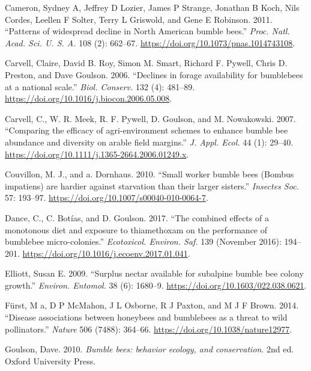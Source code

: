 \documentclass[11pt,]{article}
\begin{document}
\leavevmode\hypertarget{ref-Cameron2011}{}%
Cameron, Sydney A, Jeffrey D Lozier, James P Strange, Jonathan B Koch,
Nils Cordes, Leellen F Solter, Terry L Griswold, and Gene E Robinson.
2011. ``Patterns of widespread decline in North American bumble bees.''
\emph{Proc. Natl. Acad. Sci. U. S. A.} 108 (2): 662--67.
\url{https://doi.org/10.1073/pnas.1014743108}.

\leavevmode\hypertarget{ref-Carvell2006b}{}%
Carvell, Claire, David B. Roy, Simon M. Smart, Richard F. Pywell, Chris
D. Preston, and Dave Goulson. 2006. ``Declines in forage availability
for bumblebees at a national scale.'' \emph{Biol. Conserv.} 132 (4):
481--89. \url{https://doi.org/10.1016/j.biocon.2006.05.008}.

\leavevmode\hypertarget{ref-Carvell2007}{}%
Carvell, C., W. R. Meek, R. F. Pywell, D. Goulson, and M. Nowakowski.
2007. ``Comparing the efficacy of agri-environment schemes to enhance
bumble bee abundance and diversity on arable field margins.'' \emph{J.
Appl. Ecol.} 44 (1): 29--40.
\url{https://doi.org/10.1111/j.1365-2664.2006.01249.x}.

\leavevmode\hypertarget{ref-Couvillon2010}{}%
Couvillon, M. J., and a. Dornhaus. 2010. ``Small worker bumble bees
(Bombus impatiens) are hardier against starvation than their larger
sisters.'' \emph{Insectes Soc.} 57: 193--97.
\url{https://doi.org/10.1007/s00040-010-0064-7}.

\leavevmode\hypertarget{ref-Dance2017}{}%
Dance, C., C. Botías, and D. Goulson. 2017. ``The combined effects of a
monotonous diet and exposure to thiamethoxam on the performance of
bumblebee micro-colonies.'' \emph{Ecotoxicol. Environ. Saf.} 139
(November 2016): 194--201.
\url{https://doi.org/10.1016/j.ecoenv.2017.01.041}.

\leavevmode\hypertarget{ref-Elliott2009}{}%
Elliott, Susan E. 2009. ``Surplus nectar available for subalpine bumble
bee colony growth.'' \emph{Environ. Entomol.} 38 (6): 1680--9.
\url{https://doi.org/10.1603/022.038.0621}.

\leavevmode\hypertarget{ref-Furst2014}{}%
Fürst, M a, D P McMahon, J L Osborne, R J Paxton, and M J F Brown. 2014.
``Disease associations between honeybees and bumblebees as a threat to
wild pollinators.'' \emph{Nature} 506 (7488): 364--66.
\url{https://doi.org/10.1038/nature12977}.

\leavevmode\hypertarget{ref-Goulson2008}{}%
Goulson, Dave. 2010. \emph{Bumble bees: behavior ecology, and
conservation}. 2nd ed. Oxford University Press.
\end{document}
